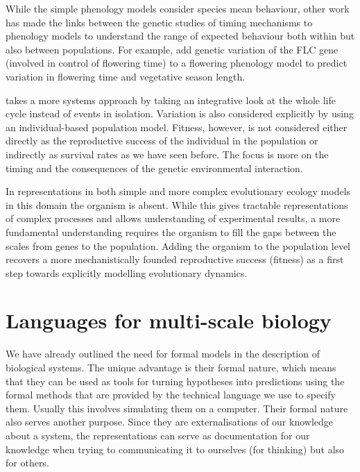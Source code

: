 While the simple phenology models consider species mean behaviour, other work
has made the links between the genetic studies of timing mechanisms to phenology
models to understand the range of expected behaviour both within but also
between populations. For example, \citet{wilczek_effects_2009} add genetic
variation of the FLC gene (involved in control of flowering time) to a flowering
phenology model to predict variation in flowering time and vegetative season
length.

\citet{burghardt_modeling_2015} takes a more systems approach by taking an
integrative look at the whole life cycle instead of events in
isolation. Variation is also considered explicitly by using an individual-based
population model. Fitness, however, is not considered either directly as the
reproductive success of the individual in the population or indirectly as
survival rates as we have seen before. The focus is more on the timing and the
consequences of the genetic environmental interaction.

In representations in both simple and more complex evolutionary ecology models
in this domain the organism is absent. While this gives tractable
representations of complex processes and allows understanding of experimental
results, a more fundamental understanding requires the organism to fill the gaps
between the scales from genes to the population. Adding the organism to the
population level recovers a more mechanistically founded reproductive success
(fitness) as a first step towards explicitly modelling evolutionary dynamics.



\section{Languages for multi-scale biology}
We have already outlined the need for formal models in the description of
biological systems. The unique advantage is their formal nature, which means
that they can be used as tools for turning hypotheses into predictions using the
formal methods that are provided by the technical language we use to specify
them. Usually this involves simulating them on a computer. Their formal nature
also serves another purpose. Since they are externalisations of our knowledge
about a system, the representations can serve as documentation for our knowledge
when trying to communicating it to ourselves (for thinking) but also for others.

